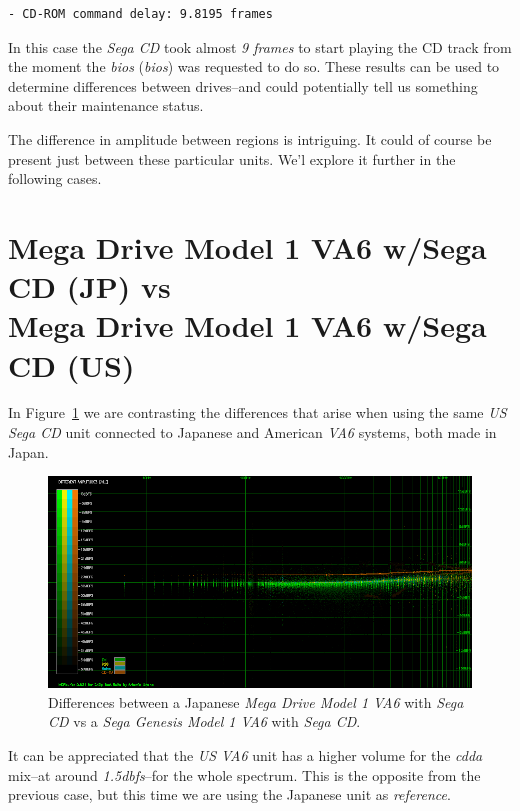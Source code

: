 \documentclass[10pt,a4paper]{report}
\newcommand{\define}[1]{\textit{\acrlong{#1}} (\textit{\acrshort{#1}})}
\newcommand{\ac}[1]{\textit{\mbox{\acrshort{#1}}}}
\newcommand{\db}[1]{\textit{\mbox{#1\acrshort{dbfs}}}}
\begin{document}
\begin{verbatim}
- CD-ROM command delay: 9.8195 frames
\end{verbatim}

In this case the \textit{Sega CD} took almost \textit{9 frames} to start playing the CD track from the moment the \define{bios} was requested to do so. These results can be used to determine differences between drives--and could potentially tell us something about their maintenance status.

The difference in amplitude between regions is intriguing. It could of course be present just between these particular units. We'l explore it further in the following cases.

\section{Mega Drive Model 1 VA6 w/Sega CD (JP) vs\\ Mega Drive Model 1 VA6 w/Sega CD (US)}

In Figure~\ref{fig:A-MD1JJVA6-SCD-LA_vs_A-MD1UJVA6-SCD} we are contrasting the differences that arise when using the same \textit{US Sega CD} unit connected to Japanese and American \textit{VA6} systems, both made in Japan.

\begin{figure}[H]
	\centering
	\includegraphics[width=1.0\linewidth]{images/results/11-A-MD1JJVA6-SCD-LA_vs_A-MD1UJVA6-SCD.png}
	\caption[A-MD1JJVA6-SCD-LA vs A-MD1UJVA6-SCD]{Differences between a Japanese \textit{Mega Drive Model 1 VA6} with \textit{Sega CD} vs a \textit{Sega Genesis Model 1 VA6} with \textit{Sega CD}.}
	\label{fig:A-MD1JJVA6-SCD-LA_vs_A-MD1UJVA6-SCD}
\end{figure}

It can be appreciated that the \textit{US VA6} unit has a higher volume for the \ac{cdda} mix--at around \db{1.5}--for the whole spectrum. This is the opposite from the previous case, but this time we are using the Japanese unit as \textit{reference}.
\end{document}
